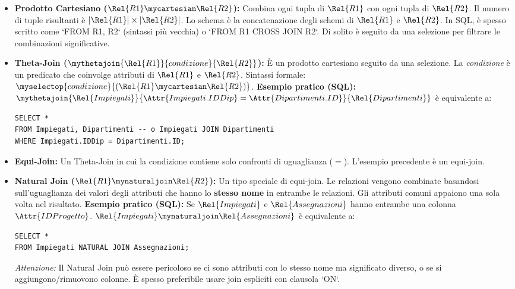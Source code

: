 \begin{itemize}
	\item \textbf{Prodotto Cartesiano ($\Rel{R1} \mycartesian \Rel{R2}$):}
	Combina ogni tupla di $\Rel{R1}$ con ogni tupla di $\Rel{R2}$. Il numero di tuple risultanti è $|\Rel{R1}| \times |\Rel{R2}|$. Lo schema è la concatenazione degli schemi di $\Rel{R1}$ e $\Rel{R2}$.
	In SQL, è spesso scritto come `FROM R1, R2` (sintassi più vecchia) o `FROM R1 CROSS JOIN R2`. Di solito è seguito da una selezione per filtrare le combinazioni significative.
	
	\item \textbf{Theta-Join ($\mythetajoin{\Rel{R1}}{condizione}{\Rel{R2}}$):}
	È un prodotto cartesiano seguito da una selezione. La \textit{condizione} è un predicato che coinvolge attributi di $\Rel{R1}$ e $\Rel{R2}$.
	Sintassi formale: $\myselectop{condizione}{(\Rel{R1} \mycartesian \Rel{R2})}$.
	\textbf{Esempio pratico (SQL):}
	$\mythetajoin{\Rel{Impiegati}}{\Attr{Impiegati.IDDip} = \Attr{Dipartimenti.ID}}{\Rel{Dipartimenti}}$
	è equivalente a:
	\begin{verbatim}
SELECT *
FROM Impiegati, Dipartimenti -- o Impiegati JOIN Dipartimenti
WHERE Impiegati.IDDip = Dipartimenti.ID;
	\end{verbatim}
	
	\item \textbf{Equi-Join:} Un Theta-Join in cui la condizione contiene solo confronti di uguaglianza ($=$). L'esempio precedente è un equi-join.
	
	\item \textbf{Natural Join ($\Rel{R1} \mynaturaljoin \Rel{R2}$):}
	Un tipo speciale di equi-join. Le relazioni vengono combinate basandosi sull'uguaglianza dei valori degli attributi che hanno lo \textbf{stesso nome} in entrambe le relazioni. Gli attributi comuni appaiono una sola volta nel risultato.
	\textbf{Esempio pratico (SQL):} Se $\Rel{Impiegati}$ e $\Rel{Assegnazioni}$ hanno entrambe una colonna $\Attr{IDProgetto}$.
	$\Rel{Impiegati} \mynaturaljoin \Rel{Assegnazioni}$
	è equivalente a:
	\begin{verbatim}
SELECT *
FROM Impiegati NATURAL JOIN Assegnazioni;
	\end{verbatim}
	\textit{Attenzione:} Il Natural Join può essere pericoloso se ci sono attributi con lo stesso nome ma significato diverso, o se si aggiungono/rimuovono colonne. È spesso preferibile usare join espliciti con clausola `ON`.
\end{itemize}

